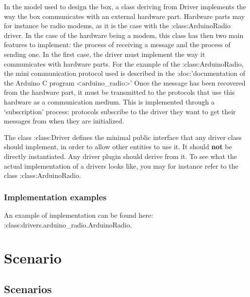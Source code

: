 \documentclass[letterpaper,10pt,english]{sphinxmanual}
\begin{document}
\begin{fulllineitems}
\label{api/models:models.Driver}
In the model used to design the box, a class deriving from 
Driver implements the way the box communicates with an external
hardware part. Hardware parts may for instance be radio modems, 
as it is the case with the :class:ArduinoRadio driver.
In the case of the hardware being a modem, this class has then
two main features to implement: the process of receiving a 
message and the process of sending one.
In the first case, the driver must implement the way it 
communicates with hardware parts. For the example of the
:class:ArduinoRadio, the mini communication protocol used is 
described in the :doc:'documentation of the Arduino C program \textless{}arduino\_radio\textgreater{}'
Once the message has been recovered from the hardware part,
it must be transmitted to the protocols that use this 
hardware as a communication medium. This is implemented
through a `subscription' process: protocols subscribe to 
the driver they want to get their messages from when
they are initialized.

The class :class:Driver defines the minimal public 
interface that any driver class should implement, in order 
to allow other entities to use it.  
It should \textbf{not} be directly instantiated.
Any driver plugin should derive from it. To see what the actual
implementation of a drivers looks like, you may for instance refer
to the class :class:ArduinoRadio.

\end{fulllineitems}



\subsubsection{Implementation examples}
\label{api/models:id3}
An example of implementation can be found here: :class:drivers.arduino\_radio.ArduinoRadio.


\section{Scenario}
\label{api/scenario::doc}\label{api/scenario:scenario}

\subsection{Scenarios}
\label{api/scenario:scenarios}
\end{document}
